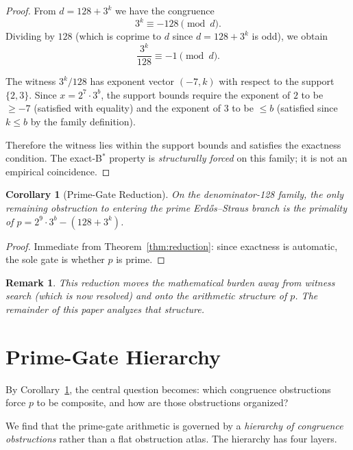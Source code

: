 \documentclass[11pt,letterpaper]{article}
\newtheorem{corollary}[theorem]{Corollary}
\newtheorem{remark}[theorem]{Remark}
\begin{document}
\begin{proof}
From $d = 128 + 3^k$ we have the congruence
\begin{equation}\label{eq:cong}
    3^k \equiv -128 \pmod{d}.
\end{equation}
Dividing by $128$ (which is coprime to $d$ since $d = 128 + 3^k$ is odd), we obtain
\begin{equation}
    \frac{3^k}{128} \equiv -1 \pmod{d}.
\end{equation}

The witness $3^k/128$ has exponent vector $(-7, k)$ with respect to the support $\{2, 3\}$.
Since $x = 2^7 \cdot 3^b$, the support bounds require the exponent of $2$ to be $\geq -7$ (satisfied with equality) and the exponent of $3$ to be $\leq b$ (satisfied since $k \leq b$ by the family definition).

Therefore the witness lies within the support bounds and satisfies the exactness condition.
The exact-B$^\ast$ property is \emph{structurally forced} on this family; it is not an empirical coincidence.
\end{proof}

\begin{corollary}[Prime-Gate Reduction]\label{cor:primegate}
On the denominator-128 family, the only remaining obstruction to entering the prime Erd\H{o}s--Straus branch is the primality of $p = 2^9 \cdot 3^b - (128 + 3^k)$.
\end{corollary}

\begin{proof}
Immediate from Theorem~\ref{thm:reduction}: since exactness is automatic, the sole gate is whether $p$ is prime.
\end{proof}

\begin{remark}
This reduction moves the mathematical burden away from witness search (which is now resolved) and onto the arithmetic structure of $p$.
The remainder of this paper analyzes that structure.
\end{remark}

\section{Prime-Gate Hierarchy}\label{sec:hierarchy}

By Corollary~\ref{cor:primegate}, the central question becomes: which congruence obstructions force $p$ to be composite, and how are those obstructions organized?

We find that the prime-gate arithmetic is governed by a \emph{hierarchy of congruence obstructions} rather than a flat obstruction atlas.
The hierarchy has four layers.
\end{document}
